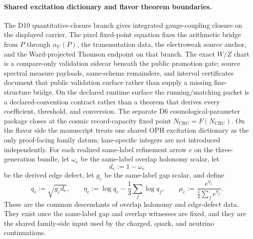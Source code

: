 \documentclass[11pt]{article}
\begin{document}
\paragraph{Shared excitation dictionary and flavor theorem boundaries.}
The D10 quantitative-closure branch gives integrated gauge-coupling closure on the displayed carrier. The pixel fixed-point equation fixes the arithmetic bridge from \(P\) through \(\alpha_U(P)\), the transmutation data, the electroweak source anchor, and the Ward-projected Thomson endpoint on that branch. The exact \(W/Z\) chart is a compare-only validation sidecar beneath the public promotion gate; source spectral measure payloads, same-scheme remainders, and interval certificates document that public validation surface rather than supply a missing fine-structure bridge. On the declared runtime surface the running/matching packet is a declared-convention contract rather than a theorem that derives every coefficient, threshold, and conversion. The separate D6 cosmological-parameter package closes at the cosmic record-capacity fixed point \(N_{\mathrm{CRC}}=F(N_{\mathrm{CRC}})\). On the flavor side the manuscript treats one shared OPH excitation dictionary as the only proof-facing family datum; lane-specific integers are not introduced independently. For each realized same-label refinement arrow \(e\) on the three-generation bundle, let \(\omega_e\) be the same-label overlap holonomy scalar, let
\[
d_e:=1-\omega_e
\]
be the derived edge defect, let \(g_e\) be the same-label gap scalar, and define
\[
q_e:=\sqrt{g_e d_e},
\qquad
\eta_e:=\log q_e-\frac13\sum_f \log q_f,
\qquad
\mu_e:=\frac{e^{\eta_e}}{\frac13\sum_f e^{\eta_f}}.
\]
These are the common descendants of overlap holonomy and edge-defect data. They exist once the same-label gap and overlap witnesses are fixed, and they are the shared family-side input used by the charged, quark, and neutrino continuations.
\end{document}
